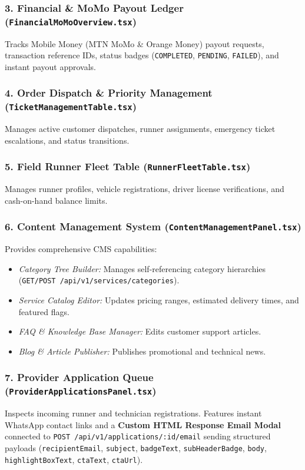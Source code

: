 \documentclass[11pt,a4paper]{article}
\begin{document}
\subsubsection{3. Financial \& MoMo Payout Ledger (\texttt{FinancialMoMoOverview.tsx})}
Tracks Mobile Money (MTN MoMo \& Orange Money) payout requests, transaction reference IDs, status badges (\texttt{COMPLETED}, \texttt{PENDING}, \texttt{FAILED}), and instant payout approvals.

\subsubsection{4. Order Dispatch \& Priority Management (\texttt{TicketManagementTable.tsx})}
Manages active customer dispatches, runner assignments, emergency ticket escalations, and status transitions.

\subsubsection{5. Field Runner Fleet Table (\texttt{RunnerFleetTable.tsx})}
Manages runner profiles, vehicle registrations, driver license verifications, and cash-on-hand balance limits.

\subsubsection{6. Content Management System (\texttt{ContentManagementPanel.tsx})}
Provides comprehensive CMS capabilities:
\begin{itemize}
    \item \textit{Category Tree Builder:} Manages self-referencing category hierarchies (\texttt{GET/POST /api/v1/services/categories}).
    \item \textit{Service Catalog Editor:} Updates pricing ranges, estimated delivery times, and featured flags.
    \item \textit{FAQ \& Knowledge Base Manager:} Edits customer support articles.
    \item \textit{Blog \& Article Publisher:} Publishes promotional and technical news.
\end{itemize}

\subsubsection{7. Provider Application Queue (\texttt{ProviderApplicationsPanel.tsx})}
Inspects incoming runner and technician registrations. Features instant WhatsApp contact links and a \textbf{Custom HTML Response Email Modal} connected to \texttt{POST /api/v1/applications/:id/email} sending structured payloads (\texttt{recipientEmail}, \texttt{subject}, \texttt{badgeText}, \texttt{subHeaderBadge}, \texttt{body}, \texttt{highlightBoxText}, \texttt{ctaText}, \texttt{ctaUrl}).
\end{document}
